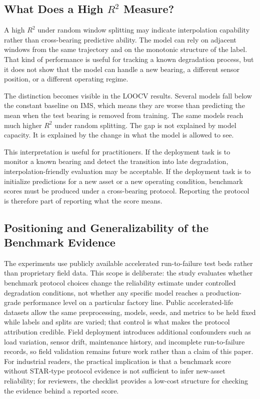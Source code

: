 \documentclass[pdflatex,sn-mathphys-num]{sn-jnl}
\begin{document}
\subsection{What Does a High $R^2$ Measure?}
A high $R^2$ under random window splitting may indicate interpolation capability rather than cross-bearing predictive ability. The model can rely on adjacent windows from the same trajectory and on the monotonic structure of the label. That kind of performance is useful for tracking a known degradation process, but it does not show that the model can handle a new bearing, a different sensor position, or a different operating regime.

The distinction becomes visible in the LOOCV results. Several models fall below the constant baseline on IMS, which means they are worse than predicting the mean when the test bearing is removed from training. The same models reach much higher $R^2$ under random splitting. The gap is not explained by model capacity. It is explained by the change in what the model is allowed to see.

This interpretation is useful for practitioners. If the deployment task is to monitor a known bearing and detect the transition into late degradation, interpolation-friendly evaluation may be acceptable. If the deployment task is to initialize predictions for a new asset or a new operating condition, benchmark scores must be produced under a cross-bearing protocol. Reporting the protocol is therefore part of reporting what the score means.

\subsection{Positioning and Generalizability of the Benchmark Evidence}
The experiments use publicly available accelerated run-to-failure test beds rather than proprietary field data. This scope is deliberate: the study evaluates whether benchmark protocol choices change the reliability estimate under controlled degradation conditions, not whether any specific model reaches a production-grade performance level on a particular factory line. Public accelerated-life datasets allow the same preprocessing, models, seeds, and metrics to be held fixed while labels and splits are varied; that control is what makes the protocol attribution credible. Field deployment introduces additional confounders such as load variation, sensor drift, maintenance history, and incomplete run-to-failure records, so field validation remains future work rather than a claim of this paper. For industrial readers, the practical implication is that a benchmark score without STAR-type protocol evidence is not sufficient to infer new-asset reliability; for reviewers, the checklist provides a low-cost structure for checking the evidence behind a reported score.
\end{document}
